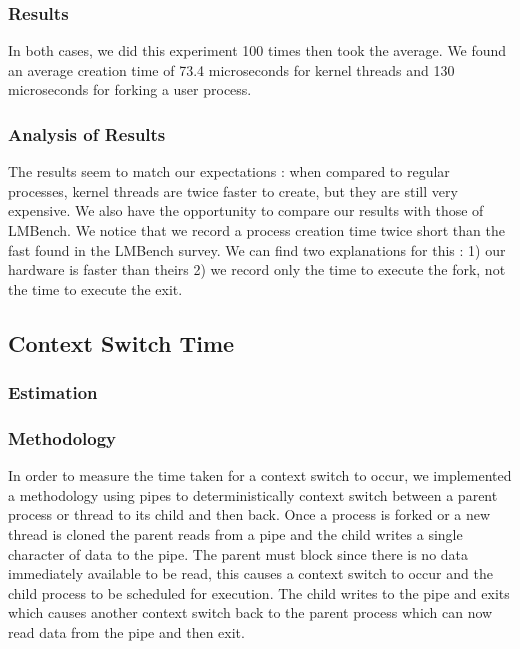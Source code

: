 \subsubsection{Results}

In both cases, we did this experiment 100 times then took the average. We found an average creation time of  73.4 microseconds for kernel threads and 130 microseconds for forking a user process.

\subsubsection{Analysis of Results}

The results seem to match our expectations : when compared to regular processes, kernel threads are twice faster to create, but they are still very expensive. We also have the opportunity to compare our results with those of LMBench. We notice that we record a process creation time twice short than the fast found in the LMBench survey. We can find two explanations for this : 1) our hardware is faster than theirs 2) we record only the time to execute the fork, not the time to execute the exit.

\subsection{Context Switch Time} 

\subsubsection{Estimation}


\subsubsection{Methodology}

In order to measure the time taken for a context switch to occur, we implemented
a methodology using pipes to deterministically context switch between a parent
process or thread to its child and then back. Once a process is forked or a new
thread is cloned the parent reads from a pipe and the child writes a single
character of data to the pipe. The parent must block since there is no data
immediately available to be read, this causes a context switch to occur and the
child process to be scheduled for execution. The child writes to the pipe and
exits which causes another context switch back to the parent process which can
now read data from the pipe and then exit. 

